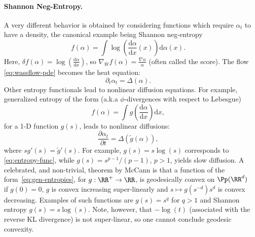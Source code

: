\paragraph{Shannon Neg-Entropy.} A very different behavior is obtained by considering functions which require $\alpha_t$ to have a density, the canonical example being Shannon neg-entropy
   \begin{equation}
       f(\alpha) = \int \log\left(\frac{\mathrm{d} \alpha}{\mathrm{d} x}(x)\right) \mathrm{d} \alpha(x). \label{eq:entropy-func}
   \end{equation}
   Here, $\delta f(\alpha) = \log\left(\frac{\mathrm{d} \alpha}{\mathrm{d} x}\right)$, so $\nabla_W f(\alpha) = \frac{\nabla \alpha}{\alpha}$ (often called the score). The flow \eqref{eq:wassflow-pde} becomes the heat equation:
   \begin{equation*}
       \partial_t \alpha_t = \Delta(\alpha).
   \end{equation*}
   Other entropy functionals lead to nonlinear diffusion equations. For example, generalized entropy of the form (a.k.a $\phi$-divergences with respect to Lebesgue)
   \begin{equation}\label{eq:gen-entropies}
       f(\alpha) = \int g\left(\frac{\mathrm{d} \alpha}{\mathrm{d} x}\right) \mathrm{d} x,
   \end{equation}
   for a 1-D function $g(s)$, leads to nonlinear diffusions:
   \begin{equation*}
       \frac{\partial \alpha_t}{\partial t} = \Delta(\tilde{g}(\alpha)),
   \end{equation*}
   where $s g'(s) = \tilde{g}'(s)$. For example, $g(s) = s \log(s)$ corresponds to \eqref{eq:entropy-func}, while $g(s) = s^{p-1}/(p-1)$, $p > 1$, yields slow diffusion.
	A celebrated, and non-trivial, theorem by McCann is that a function of the form~\eqref{eq:gen-entropies}, for $g : \RR^+ \to \RR$, is geodesically convex on $\Pp(\RR^d)$ if $g(0)=0$, $g$ is convex increasing super-linearly and $s \mapsto g(s^{-d}) s^d$ is convex decreasing.
	Examples of such functions are $g(s)=s^q$ for $q>1$ and Shannon entropy $g(s)=s \log(s)$. %
	Note, however, that $-\log(t)$ (associated with the reverse KL divergence) is not super-linear, so one cannot conclude geodesic convexity. 
	

